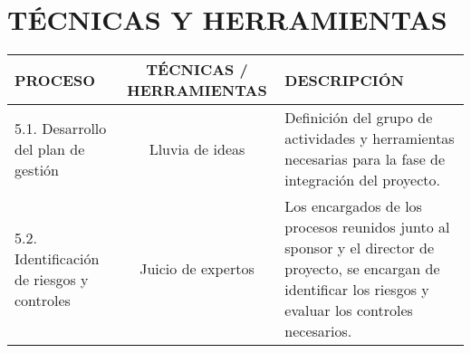 \chapter{T\'ECNICAS Y HERRAMIENTAS}
%
\begin{table}[H]
	\centering
	\begin{tabular}{| m{5cm} | c | p{5cm} |}
	\hline
	\rowcolor{LightGrey}
	\textbf{PROCESO} & \textbf{T\'ECNICAS / HERRAMIENTAS} & \textbf{DESCRIPCI\'ON} \\ \hline
	5.1. Desarrollo del plan de gesti\'on & Lluvia de ideas & Definici\'on del grupo de actividades y herramientas 
	necesarias para la fase de integraci\'on del proyecto.\\
	\hline
	5.2. Identificaci\'on de riesgos y controles & Juicio de expertos & Los encargados de los procesos reunidos
	junto al sponsor y el director de proyecto, se encargan de identificar los riesgos y evaluar los controles
	necesarios.\\
	\hline
	\end{tabular}
	
\end{table}